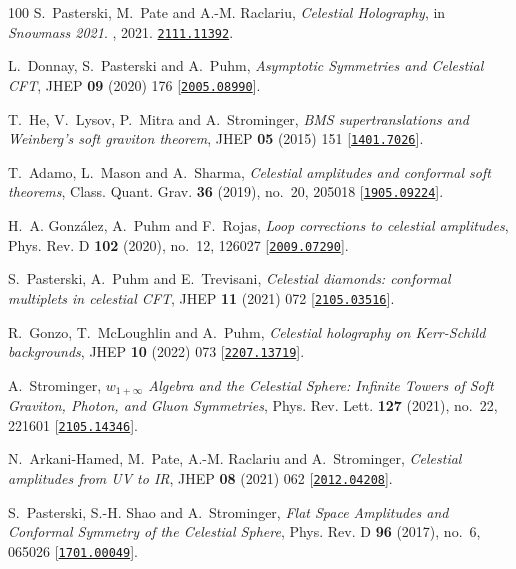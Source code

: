 \begin{thebibliography}{100}
S.~Pasterski, M.~Pate and A.-M. Raclariu,  {\em {Celestial Holography}}, in
  {\em {Snowmass 2021}}.
, 2021.
\newblock \href{http://www.arXiv.org/abs/2111.11392}{{\tt 2111.11392}}.

L.~Donnay, S.~Pasterski and A.~Puhm,  {\em {Asymptotic Symmetries and Celestial
  CFT}}, JHEP {\bf 09} (2020) 176
  [\href{http://www.arXiv.org/abs/2005.08990}{{\tt 2005.08990}}].

T.~He, V.~Lysov, P.~Mitra and A.~Strominger,  {\em {BMS supertranslations and
  Weinberg\textquoteright{}s soft graviton theorem}}, JHEP {\bf 05} (2015) 151
  [\href{http://www.arXiv.org/abs/1401.7026}{{\tt 1401.7026}}].

T.~Adamo, L.~Mason and A.~Sharma,  {\em {Celestial amplitudes and conformal
  soft theorems}}, Class. Quant. Grav. {\bf 36} (2019), no.~20, 205018
  [\href{http://www.arXiv.org/abs/1905.09224}{{\tt 1905.09224}}].

H.~A. Gonz\'alez, A.~Puhm and F.~Rojas,  {\em {Loop corrections to celestial
  amplitudes}}, Phys. Rev. D {\bf 102} (2020), no.~12, 126027
  [\href{http://www.arXiv.org/abs/2009.07290}{{\tt 2009.07290}}].

S.~Pasterski, A.~Puhm and E.~Trevisani,  {\em {Celestial diamonds: conformal
  multiplets in celestial CFT}}, JHEP {\bf 11} (2021) 072
  [\href{http://www.arXiv.org/abs/2105.03516}{{\tt 2105.03516}}].

R.~Gonzo, T.~McLoughlin and A.~Puhm,  {\em {Celestial holography on Kerr-Schild
  backgrounds}}, JHEP {\bf 10} (2022) 073
  [\href{http://www.arXiv.org/abs/2207.13719}{{\tt 2207.13719}}].

A.~Strominger,  {\em {$w_{1+\infty}$ Algebra and the Celestial Sphere: Infinite
  Towers of Soft Graviton, Photon, and Gluon Symmetries}}, Phys. Rev. Lett.
  {\bf 127} (2021), no.~22, 221601
  [\href{http://www.arXiv.org/abs/2105.14346}{{\tt 2105.14346}}].

N.~Arkani-Hamed, M.~Pate, A.-M. Raclariu and A.~Strominger,  {\em {Celestial
  amplitudes from UV to IR}}, JHEP {\bf 08} (2021) 062
  [\href{http://www.arXiv.org/abs/2012.04208}{{\tt 2012.04208}}].

S.~Pasterski, S.-H. Shao and A.~Strominger,  {\em {Flat Space Amplitudes and
  Conformal Symmetry of the Celestial Sphere}}, Phys. Rev. D {\bf 96} (2017),
  no.~6, 065026 [\href{http://www.arXiv.org/abs/1701.00049}{{\tt 1701.00049}}].


\end{thebibliography}
